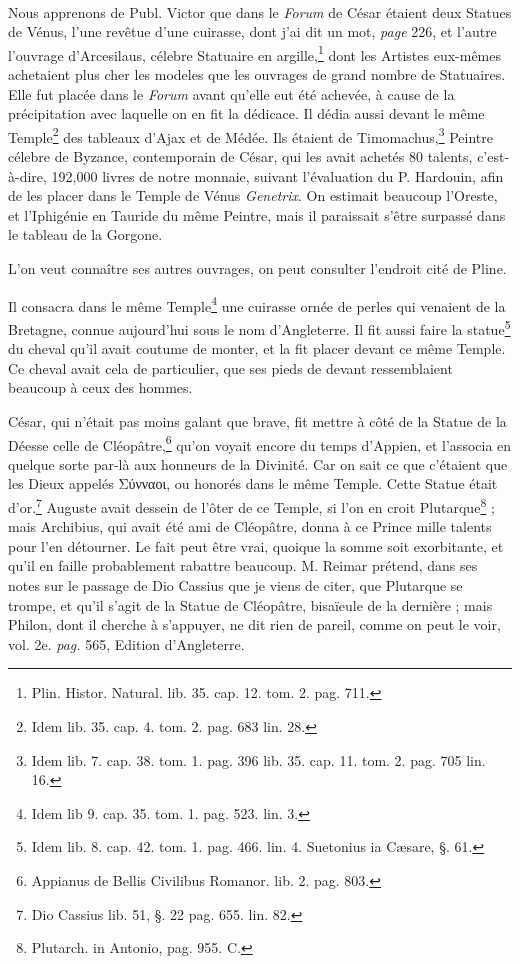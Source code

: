 \documentclass[a4paper, 18pt, oneside]{article}
\begin{document}
\paragraph{}
Nous apprenons de Publ. Victor que dans le \emph{Forum} de César étaient deux Statues de Vénus, l'une revêtue d'une cuirasse, dont j'ai dit un mot, \emph{page} 226, et l'autre l'ouvrage d'Arcesilaus, célebre Statuaire en argille,\footnote{Plin. Histor. Natural. lib. 35. cap. 12. tom. 2. pag. 711.} dont les Artistes eux-mêmes achetaient plus cher les modeles que les ouvrages de grand nombre de Statuaires. Elle fut placée dans le \emph{Forum} avant qu'elle eut été achevée, à cause de la précipitation avec laquelle on en fit la dédicace. Il dédia aussi devant le même Temple\footnote{Idem lib. 35. cap. 4. tom. 2. pag. 683 lin. 28.} des tableaux d'Ajax et de Médée. Ils étaient de Timomachus,\footnote{Idem lib. 7. cap. 38. tom. 1. pag. 396 lib. 35. cap. 11. tom. 2. pag. 705 lin. 16.} Peintre célebre de Byzance, contemporain de César, qui les avait achetés 80 talents, c'est-à-dire, 192,000 livres de notre monnaie, suivant l'évaluation du P. Hardouin, afin de les placer dans le Temple de Vénus \emph{Genetrix}. On estimait beaucoup l'Oreste, et l'Iphigénie en Tauride du même Peintre, mais il paraissait s'être surpassé dans le tableau de la Gorgone.

L'on veut connaître ses autres ouvrages, on peut consulter l'endroit cité de Pline.

Il consacra dans le même Temple\footnote{Idem lib 9. cap. 35. tom. 1. pag. 523. lin. 3.} une cuirasse ornée de perles qui venaient de la Bretagne, connue aujourd'hui sous le nom d'Angleterre. Il fit aussi faire la statue\footnote{Idem lib. 8. cap. 42. tom. 1. pag. 466. lin. 4. Suetonius ia Cæsare, §. 61.} du cheval qu'il avait coutume de monter, et la fit placer devant ce même Temple. Ce cheval avait cela de particulier, que ses pieds de devant ressemblaient beaucoup à ceux des hommes.

César, qui n'était pas moins galant que brave, fit mettre à côté de la Statue de la Déesse celle de Cléopâtre,\footnote{Appianus de Bellis Civilibus Romanor. lib. 2. pag. 803.} qu'on voyait encore du temps d'Appien, et l'associa en quelque sorte par-là aux honneurs de la Divinité. Car on sait ce que c'étaient que les Dieux appelés Σύνναοι, ou honorés dans le même Temple. Cette Statue était d'or.\footnote{Dio Cassius lib. 51, §. 22 pag. 655. lin. 82.} Auguste avait dessein de l'ôter de ce Temple, si l'on en croit Plutarque\footnote{Plutarch. in Antonio, pag. 955. C.} ; mais Archibius, qui avait été ami de Cléopâtre, donna à ce Prince mille talents pour l'en détourner. Le fait peut être vrai, quoique la somme soit exorbitante, et qu'il en faille probablement rabattre beaucoup. M. Reimar prétend, dans ses notes sur le passage de Dio Cassius que je viens de citer, que Plutarque se trompe, et qu'il s'agit de la Statue de Cléopâtre, bisaïeule de la dernière ; mais Philon, dont il cherche à s'appuyer, ne dit rien de pareil, comme on peut le voir, vol. 2e. \emph{pag.} 565, Edition d'Angleterre.
\end{document}
